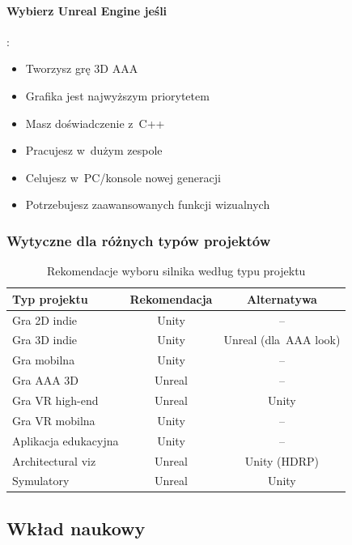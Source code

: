 \paragraph{Wybierz Unreal Engine jeśli}:
\begin{itemize}
    \item Tworzysz grę 3D AAA
    \item Grafika jest najwyższym priorytetem
    \item Masz doświadczenie z~C++
    \item Pracujesz w~dużym zespole
    \item Celujesz w~PC/konsole nowej generacji
    \item Potrzebujesz zaawansowanych funkcji wizualnych
\end{itemize}

\subsubsection{Wytyczne dla różnych typów projektów}

\begin{table}[h!]
    \centering
    \caption{Rekomendacje wyboru silnika według typu projektu}
    \label{tab:recommendations}
    \begin{tabular}{|l|c|c|}
        \hline
        \textbf{Typ projektu} & \textbf{Rekomendacja} & \textbf{Alternatywa} \\
        \hline\hline
        Gra 2D indie & Unity & -- \\
        \hline
        Gra 3D indie & Unity & Unreal (dla~AAA look) \\
        \hline
        Gra mobilna & Unity & -- \\
        \hline
        Gra AAA 3D & Unreal & -- \\
        \hline
        Gra VR high-end & Unreal & Unity \\
        \hline
        Gra VR mobilna & Unity & -- \\
        \hline
        Aplikacja edukacyjna & Unity & -- \\
        \hline
        Architectural viz & Unreal & Unity (HDRP) \\
        \hline
        Symulatory & Unreal & Unity \\
        \hline
    \end{tabular}
\end{table}

\subsection{Wkład naukowy}

